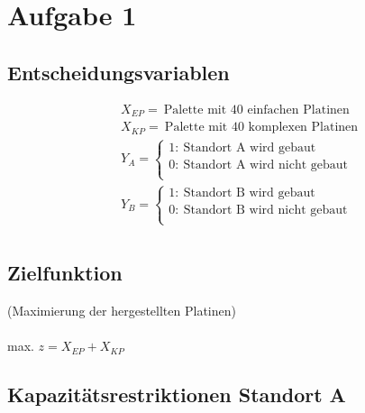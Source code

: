 \documentclass[a4paper,11pt]{article}
\begin{document}
\raggedright %

\section{Aufgabe 1}

\subsection*{Entscheidungsvariablen}

\begin{align*}
& X_{EP} = ~\text{Palette mit 40 einfachen Platinen} \\
& X_{KP} = ~\text{Palette mit 40 komplexen Platinen} \\
& Y_A = \left\{\begin{array}{l}
            1: ~\text{Standort A wird gebaut} \\
            0: ~\text{Standort A wird nicht gebaut} \\
          \end{array}\right. \\
%
&Y_B = \left\{\begin{array}{l}
            1: ~\text{Standort B wird gebaut} \\
            0: ~\text{Standort B wird nicht gebaut} \\
          \end{array}\right. \\
\end{align*}

\subsection*{Zielfunktion}
(Maximierung der hergestellten Platinen) \\~\\

max. $z  = X_{EP} + X_{KP}$ \\

\subsection*{Kapazitätsrestriktionen Standort A}
\end{document}
